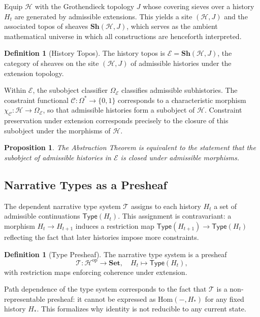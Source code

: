 \documentclass[12pt, a4paper]{article}
\theoremstyle{plain}
\newtheorem{proposition}[theorem]{Proposition}
\theoremstyle{definition}
\newtheorem{definition}[theorem]{Definition}
\theoremstyle{remark}
\begin{document}
Equip $\mathcal{H}$ with the Grothendieck topology $J$ whose covering sieves over a history $H_t$ are generated by admissible extensions. This yields a site $(\mathcal{H}, J)$ and the associated topos of sheaves $\mathbf{Sh}(\mathcal{H}, J)$, which serves as the ambient mathematical universe in which all constructions are henceforth interpreted.

\begin{definition}[History Topos]
The history topos is $\mathcal{E} = \mathbf{Sh}(\mathcal{H}, J)$, the category of sheaves on the site $(\mathcal{H}, J)$ of admissible histories under the extension topology.
\end{definition}

Within $\mathcal{E}$, the subobject classifier $\Omega_{\mathcal{E}}$ classifies admissible subhistories. The constraint functional $\mathcal{C} : \Omega^* \to \{0,1\}$ corresponds to a characteristic morphism $\chi_{\mathcal{C}} : \mathcal{H} \to \Omega_{\mathcal{E}}$, so that admissible histories form a subobject of $\mathcal{H}$. Constraint preservation under extension corresponds precisely to the closure of this subobject under the morphisms of $\mathcal{H}$.

\begin{proposition}
The Abstraction Theorem is equivalent to the statement that the subobject of admissible histories in $\mathcal{E}$ is closed under admissible morphisms.
\end{proposition}

\subsection{Narrative Types as a Presheaf}

The dependent narrative type system $\mathcal{T}$ assigns to each history $H_t$ a set of admissible continuations $\mathsf{Type}(H_t)$. This assignment is contravariant: a morphism $H_t \to H_{t+1}$ induces a restriction map $\mathsf{Type}(H_{t+1}) \to \mathsf{Type}(H_t)$ reflecting the fact that later histories impose more constraints.

\begin{definition}[Type Presheaf]
The narrative type system is a presheaf
\[
\mathcal{T} : \mathcal{H}^{\mathrm{op}} \to \mathbf{Set},
\quad H_t \mapsto \mathsf{Type}(H_t),
\]
with restriction maps enforcing coherence under extension.
\end{definition}

Path dependence of the type system corresponds to the fact that $\mathcal{T}$ is a non-representable presheaf: it cannot be expressed as $\mathrm{Hom}(-, H_*)$ for any fixed history $H_*$. This formalizes why identity is not reducible to any current state.
\end{document}
